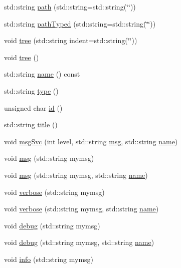 \begin{DoxyCompactItemize}
std\+::string \hyperlink{classHierarchy_aa7990fa7caf132d83e361ce033c6c65a}{path} (std\+::string=std\+::string(\char`\"{}\char`\"{}))
\item 
std\+::string \hyperlink{classHierarchy_a1efd56cd164d328d2002e53a10a19b8c}{path\+Typed} (std\+::string=std\+::string(\char`\"{}\char`\"{}))
\item 
void \hyperlink{classHierarchy_a76e914b9a677a22a82deb74d892bf261}{tree} (std\+::string indent=std\+::string(\char`\"{}\char`\"{}))
\item 
void \hyperlink{classHierarchy_a594c294c5f60c230e106d522ed008212}{tree} ()
\item 
std\+::string \hyperlink{classObject_a300f4c05dd468c7bb8b3c968868443c1}{name} () const
\item 
std\+::string \hyperlink{classObject_a84f99f70f144a83e1582d1d0f84e4e62}{type} ()
\item 
unsigned char \hyperlink{classObject_af99145335cc61ff6e2798ea17db009d2}{id} ()
\item 
std\+::string \hyperlink{classObject_a73a0f1a41828fdd8303dd662446fb6c3}{title} ()
\item 
void \hyperlink{classObject_a3f9d5537ebce0c0f2bf6ae4d92426f3c}{msg\+Svc} (int level, std\+::string \hyperlink{classObject_a58b2d0618c2d08cf2383012611528d97}{msg}, std\+::string \hyperlink{classObject_a300f4c05dd468c7bb8b3c968868443c1}{name})
\item 
void \hyperlink{classObject_a58b2d0618c2d08cf2383012611528d97}{msg} (std\+::string mymsg)
\item 
void \hyperlink{classObject_ac5d59299273cee27aacf7de00d2e7034}{msg} (std\+::string mymsg, std\+::string \hyperlink{classObject_a300f4c05dd468c7bb8b3c968868443c1}{name})
\item 
void \hyperlink{classObject_a83d2db2df682907ea1115ad721c1c4a1}{verbose} (std\+::string mymsg)
\item 
void \hyperlink{classObject_a2d4120195317e2a3c6532e8bb9f3da68}{verbose} (std\+::string mymsg, std\+::string \hyperlink{classObject_a300f4c05dd468c7bb8b3c968868443c1}{name})
\item 
void \hyperlink{classObject_aac010553f022165573714b7014a15f0d}{debug} (std\+::string mymsg)
\item 
void \hyperlink{classObject_a6c9a0397ca804e04d675ed05683f5420}{debug} (std\+::string mymsg, std\+::string \hyperlink{classObject_a300f4c05dd468c7bb8b3c968868443c1}{name})
\item 
void \hyperlink{classObject_a644fd329ea4cb85f54fa6846484b84a8}{info} (std\+::string mymsg)

\end{DoxyCompactItemize}
